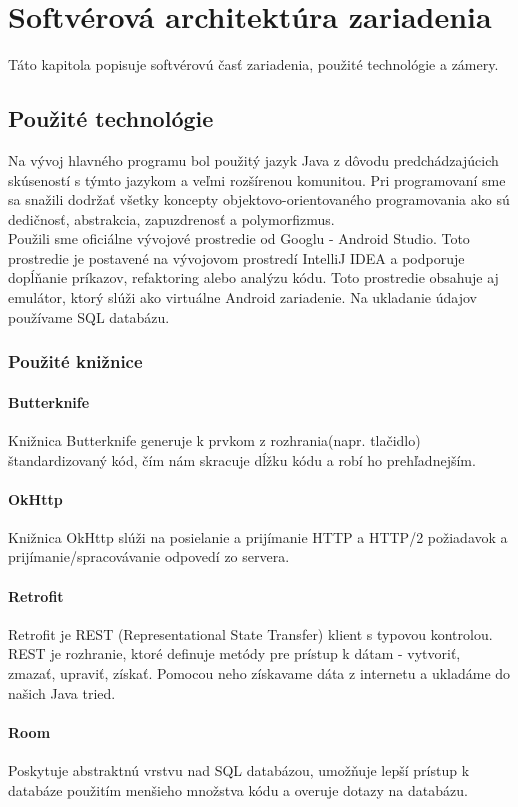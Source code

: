 \documentclass{template/socthesis}
\begin{document}
\chapter{Softvérová architektúra zariadenia}
Táto kapitola popisuje softvérovú časť zariadenia, použité technológie a zámery.

\section{Použité technológie}
Na vývoj hlavného programu bol použitý jazyk Java z dôvodu predchádzajúcich skúseností s týmto jazykom a veľmi rozšírenou komunitou. Pri programovaní sme sa snažili dodržať všetky koncepty objektovo-orientovaného programovania ako sú dedičnosť, abstrakcia, zapuzdrenosť a polymorfizmus. \\

Použili sme oficiálne vývojové prostredie od Googlu - Android Studio. Toto prostredie je postavené na vývojovom prostredí IntelliJ IDEA a podporuje dopĺňanie príkazov, refaktoring alebo analýzu kódu. Toto prostredie obsahuje aj emulátor, ktorý slúži ako virtuálne Android zariadenie. Na ukladanie údajov používame SQL databázu.

\subsection*{Použité knižnice}
\subsubsection{Butterknife}
Knižnica Butterknife generuje k prvkom z rozhrania(napr. tlačidlo) štandardizovaný kód, čím nám skracuje dĺžku kódu a robí ho prehľadnejším.
\subsubsection{OkHttp}
Knižnica OkHttp slúži na posielanie a prijímanie HTTP a HTTP/2 požiadavok a prijímanie/spracovávanie odpovedí zo servera.
\subsubsection{Retrofit}
Retrofit je REST (Representational State Transfer) klient s typovou kontrolou. REST je rozhranie, ktoré definuje metódy pre prístup k dátam - vytvoriť, zmazať, upraviť, získať. Pomocou neho získavame dáta z internetu a ukladáme do našich Java tried.
\subsubsection{Room}
Poskytuje abstraktnú vrstvu nad SQL databázou, umožňuje lepší prístup k databáze použitím menšieho množstva kódu a overuje dotazy na databázu.
\end{document}
